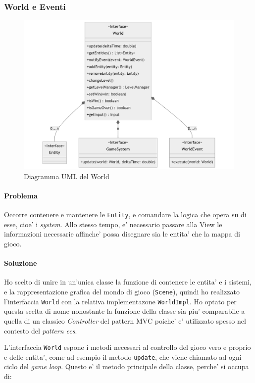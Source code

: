 \documentclass[a4paper,12pt]{report}
\begin{document}
\subsubsection{World e Eventi}

\begin{figure}[h]
	\centering
	\includegraphics[width=\textwidth]{uml/uml_world.png}
	\caption{Diagramma UML del World}
\end{figure}

\paragraph*{Problema}
Occorre contenere e mantenere le \texttt{Entity}, e comandare la logica che opera su di esse, cioe' i \textit{system}. Allo stesso tempo, e' necessario passare alla View le informazioni necessarie affinche' possa disegnare sia le entita' che la mappa di gioco. 

\paragraph*{Soluzione}
Ho scelto di unire in un'unica classe la funzione di contenere le entita' e i sistemi, e la rappresentazione grafica del mondo di gioco (\texttt{Scene}), quindi ho realizzato l'interfaccia \texttt{World} con la relativa implementazone \texttt{WorldImpl}. Ho optato per questa scelta di nome nonostante la funzione della classe sia piu' comparabile a quella di un classico \textit{Controller} del pattern MVC poiche' e' utilizzato spesso nel contesto del \textit{pattern ecs}.

L'interfaccia \texttt{World} espone i metodi necessari al controllo del gioco vero e proprio e delle entita', come ad esempio il metodo \texttt{update}, che viene chiamato ad ogni ciclo del \textit{game loop}. Questo e' il metodo principale della classe, perche' si occupa di:
\end{document}
